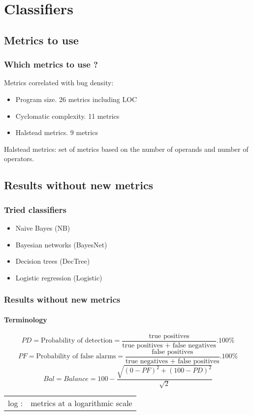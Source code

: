 \section{Classifiers}

\subsection{Metrics to use}
\begin{frame}
 \frametitle{Which metrics to use ?}
 Metrics correlated with bug density:
 \begin{itemize}
  \item Program size. 26 metrics including LOC
  \item Cyclomatic complexity. 11 metrics
  \item Halstead metrics. 9 metrics
 \end{itemize}
 \vspace{0.5cm}
 \small Halstead metrics: set of metrics based on the number of operands and number of operators. \normalsize
\end{frame}

\subsection{Results without new metrics}
\begin{frame}
 \frametitle{Tried classifiers}
 \begin{itemize}
  \item Naive Bayes (NB)
  \item Bayesian networks (BayesNet)
  \item Decision trees (DecTree)
  \item Logistic regression (Logistic)
 \end{itemize}
\end{frame}

\begin{frame}
 \frametitle{Results without new metrics}
 \framesubtitle{Terminology}
 $$PD = \text{Probability of detection} = \frac{\text{true positives}}{\text{true positives + false negatives}} . 100\%$$
 \vspace{0.3cm}
 $$PF = \text{Probability of false alarms} = \frac{\text{false positives}}{\text{true negatives + false positives}} . 100\%$$
 \vspace{0.3cm}
 $$Bal = Balance = 100 - \frac{\sqrt{(0-PF)^2 + (100-PD)^2}}{\sqrt{2}}$$
 \begin{center}
  \begin{tabular}{ll}
   log : & metrics at a logarithmic scale
  \end{tabular}
 \end{center}
\end{frame}

